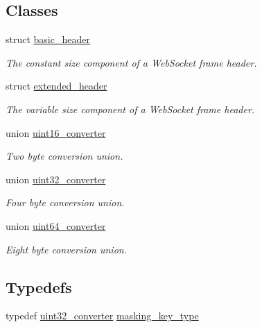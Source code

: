 \subsection*{Classes}
\begin{DoxyCompactItemize}
\item 
struct \hyperlink{structwebsocketpp_1_1frame_1_1basic__header}{basic\+\_\+header}
\begin{DoxyCompactList}\small\item\em The constant size component of a Web\+Socket frame header. \end{DoxyCompactList}\item 
struct \hyperlink{structwebsocketpp_1_1frame_1_1extended__header}{extended\+\_\+header}
\begin{DoxyCompactList}\small\item\em The variable size component of a Web\+Socket frame header. \end{DoxyCompactList}\item 
union \hyperlink{unionwebsocketpp_1_1frame_1_1uint16__converter}{uint16\+\_\+converter}
\begin{DoxyCompactList}\small\item\em Two byte conversion union. \end{DoxyCompactList}\item 
union \hyperlink{unionwebsocketpp_1_1frame_1_1uint32__converter}{uint32\+\_\+converter}
\begin{DoxyCompactList}\small\item\em Four byte conversion union. \end{DoxyCompactList}\item 
union \hyperlink{unionwebsocketpp_1_1frame_1_1uint64__converter}{uint64\+\_\+converter}
\begin{DoxyCompactList}\small\item\em Eight byte conversion union. \end{DoxyCompactList}\end{DoxyCompactItemize}
\subsection*{Typedefs}
\begin{DoxyCompactItemize}
\item 
typedef \hyperlink{unionwebsocketpp_1_1frame_1_1uint32__converter}{uint32\+\_\+converter} \hyperlink{namespacewebsocketpp_1_1frame_a8bdac8ec44c78c027fcf55aa3bad3f86}{masking\+\_\+key\+\_\+type}
\end{DoxyCompactItemize}
